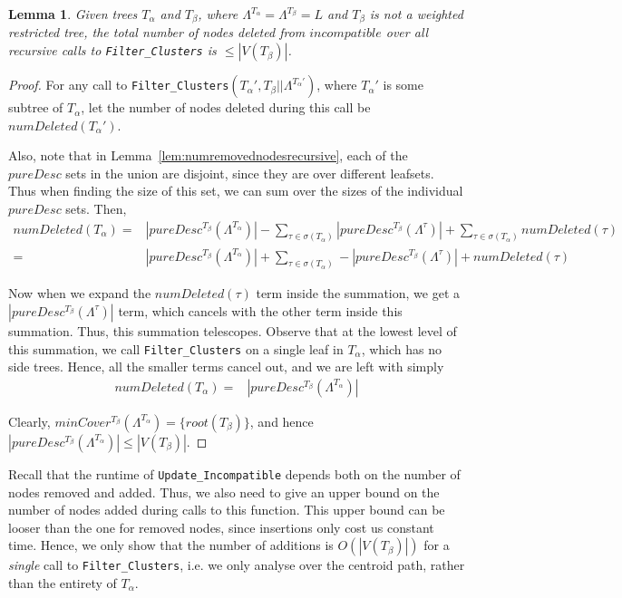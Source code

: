 \documentclass[final,1p,times]{elsarticle}
\newcommand{\leafset}{\Lambda}
\newcommand{\TA}{T_\alpha}
\newcommand{\TB}{T_\beta}
\newtheorem{lemma}[theorem]{Lemma}
\begin{document}
    \begin{lemma}
        \label{lem:numremovednodes}
        Given trees $\TA$ and $\TB$, where $\leafset^{\TA} = \leafset^{\TB} = L$ and $\TB$ is not a weighted restricted tree, the total number of nodes deleted from $incompatible$ over all recursive calls to \texttt{Filter\_Clusters} is $\leq |V(\TB)|$.
    \end{lemma}
        \begin{proof}
            For any call to \texttt{Filter\_Clusters}$(T_{\alpha}', \TB||\leafset^{T_{\alpha}'})$, where $T_{\alpha}'$ is some subtree of $\TA$, let the number of nodes deleted during this call be $numDeleted(T_{\alpha}')$.

            Also, note that in Lemma~\ref{lem:numremovednodesrecursive}, each of the $pureDesc$ sets in the union are disjoint, since they are over different leafsets. Thus when finding the size of this set, we can sum over the sizes of the individual $pureDesc$ sets. Then,
            \begin{align*}
                numDeleted(\TA) =& |pureDesc^{\TB}(\leafset^{\TA})| - \sum_{\tau \in \sigma(\TA)} |pureDesc^{\TB}(\leafset^{\tau})| + \sum_{\tau \in \sigma(\TA)} numDeleted(\tau)\\
                =& |pureDesc^{\TB}(\leafset^{\TA})| + \sum_{\tau \in \sigma(\TA)} - |pureDesc^{\TB}(\leafset^{\tau})| + numDeleted(\tau)
            \end{align*}

            Now when we expand the $numDeleted(\tau)$ term inside the summation, we get a $|pureDesc^{\TB}(\leafset^{\tau})|$ term, which cancels with the other term inside this summation. Thus, this summation telescopes. Observe that at the lowest level of this summation, we call \texttt{Filter\_Clusters} on a single leaf in $\TA$, which has no side trees. Hence, all the smaller terms cancel out, and we are left with simply
            \begin{align*}
                numDeleted(\TA) =& |pureDesc^{\TB}(\leafset^{\TA})|
            \end{align*}

            Clearly, $minCover^{\TB}(\leafset^{\TA}) = \{root(\TB)\}$, and hence $|pureDesc^{\TB}(\leafset^{\TA})| \leq |V(\TB)|$.
        \end{proof}

    Recall that the runtime of \texttt{Update\_Incompatible} depends both on the number of nodes removed and added. Thus, we also need to give an upper bound on the number of nodes added during calls to this function. This upper bound can be looser than the one for removed nodes, since insertions only cost us constant time. Hence, we only show that the number of additions is $O(|V(\TB)|)$ for a \textit{single} call to \texttt{Filter\_Clusters}, i.e. we only analyse over the centroid path, rather than the entirety of $\TA$.
    \newline
\end{document}
